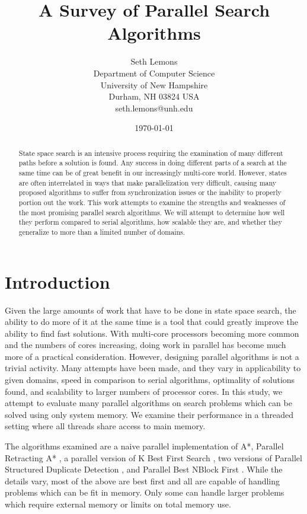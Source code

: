 \documentclass{article}
\title{A Survey of Parallel Search Algorithms}
\author{Seth Lemons \\
Department of Computer Science \\
University of New Hampshire \\
Durham, NH 03824 USA \\
seth.lemons@unh.edu}
\date{\today}
\begin{document}
\maketitle

\begin{abstract}
State space search is an intensive process requiring the examination of many different paths before a solution is found. Any success in doing different parts of a search at the same time can be of great benefit in our increasingly multi-core world. However, states are often interrelated in ways that make parallelization very difficult, causing many proposed algorithms to suffer from synchronization issues or the inability to properly portion out the work. This work attempts to examine the strengths and weaknesses of the most promising parallel search algorithms. We will attempt to determine how well they perform compared to serial algorithms, how scalable they are, and whether they generalize to more than a limited number of domains.
\end{abstract}

\section{Introduction}
Given the large amounts of work that have to be done in state space search, the ability to do more of it at the same time is a tool that could greatly improve the ability to find fast solutions. With multi-core processors becoming more common and the numbers of cores increasing, doing work in parallel has become much more of a practical consideration. However, designing parallel algorithms is not a trivial activity. Many attempts have been made, and they vary in applicability to given domains, speed in comparison to serial algorithms, optimality of solutions found, and scalability to larger numbers of processor cores. In this study, we attempt to evaluate many parallel algorithms on search problems which can be solved using only system memory. We examine their performance in a threaded setting where all threads share access to main memory.

The algorithms examined are a naive parallel implementation of A*, Parallel Retracting A* \cite{evett:pra}, a parallel version of K Best First Search \cite{felner:kbf}, two versions of Parallel Structured Duplicate Detection \cite{zhou:psd}, and Parallel Best NBlock First \cite{burns:par}. While the details vary, most of the above are best first and all are capable of handling problems which can be fit in memory. Only some can handle larger problems which require external memory or limits on total memory use.
\end{document}
